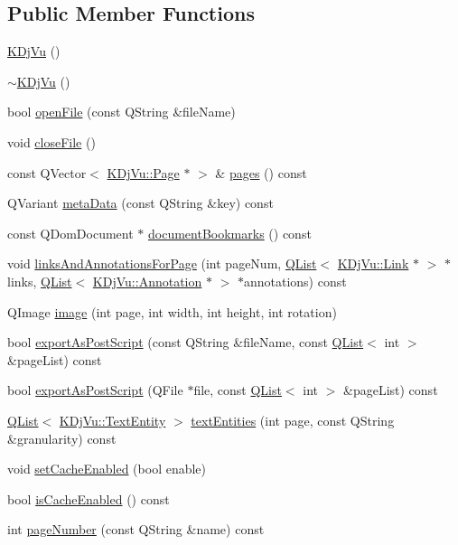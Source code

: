 \subsection*{Public Member Functions}
\begin{DoxyCompactItemize}
\item 
\hyperlink{classKDjVu_a616b53cbee98267de0ba2d26fc7d31c4}{K\+Dj\+Vu} ()
\item 
\hyperlink{classKDjVu_ae6b2a9ce935439f8479bc6b9f0577b67}{$\sim$\+K\+Dj\+Vu} ()
\item 
bool \hyperlink{classKDjVu_a223ea1608a7b3ed9314bd89a2534dfd5}{open\+File} (const Q\+String \&file\+Name)
\item 
void \hyperlink{classKDjVu_af9c1d642f5ef455739abadf09ed44586}{close\+File} ()
\item 
const Q\+Vector$<$ \hyperlink{classKDjVu_1_1Page}{K\+Dj\+Vu\+::\+Page} $\ast$ $>$ \& \hyperlink{classKDjVu_aea351abdd42f5494382d2d3d20c1a94e}{pages} () const 
\item 
Q\+Variant \hyperlink{classKDjVu_ae1a73203fc07dc0c81996810ca2f7ae3}{meta\+Data} (const Q\+String \&key) const 
\item 
const Q\+Dom\+Document $\ast$ \hyperlink{classKDjVu_a48975c0c9c80a7b85600812c22ed5fda}{document\+Bookmarks} () const 
\item 
void \hyperlink{classKDjVu_a2f2185ed09a1fe26c597f9582f4c34f2}{links\+And\+Annotations\+For\+Page} (int page\+Num, \hyperlink{classQList}{Q\+List}$<$ \hyperlink{classKDjVu_1_1Link}{K\+Dj\+Vu\+::\+Link} $\ast$ $>$ $\ast$links, \hyperlink{classQList}{Q\+List}$<$ \hyperlink{classKDjVu_1_1Annotation}{K\+Dj\+Vu\+::\+Annotation} $\ast$ $>$ $\ast$annotations) const 
\item 
Q\+Image \hyperlink{classKDjVu_a912d8a8a28dfd28bf871c0c1726b266e}{image} (int page, int width, int height, int rotation)
\item 
bool \hyperlink{classKDjVu_a476b8e76dc69d3872166fdf76ae2a8c2}{export\+As\+Post\+Script} (const Q\+String \&file\+Name, const \hyperlink{classQList}{Q\+List}$<$ int $>$ \&page\+List) const 
\item 
bool \hyperlink{classKDjVu_adfba2185adbbd950b89344f576afac23}{export\+As\+Post\+Script} (Q\+File $\ast$file, const \hyperlink{classQList}{Q\+List}$<$ int $>$ \&page\+List) const 
\item 
\hyperlink{classQList}{Q\+List}$<$ \hyperlink{classKDjVu_1_1TextEntity}{K\+Dj\+Vu\+::\+Text\+Entity} $>$ \hyperlink{classKDjVu_a658d09462a1b727a001c6f7f183a3f7e}{text\+Entities} (int page, const Q\+String \&granularity) const 
\item 
void \hyperlink{classKDjVu_a175f29677ef28f549a709b337f917d92}{set\+Cache\+Enabled} (bool enable)
\item 
bool \hyperlink{classKDjVu_ada3da14d01ead551278e089ed49ce4e2}{is\+Cache\+Enabled} () const 
\item 
int \hyperlink{classKDjVu_a5b74281ec02d098b0bac883552fbb2e7}{page\+Number} (const Q\+String \&name) const 
\end{DoxyCompactItemize}


